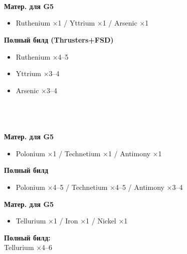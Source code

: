 \begin{tcolorbox}[edbox-titled, title=3.~PROFESSOR PALIN]
\\
\\
\\[1mm]
\edrule
{\color{edorange}\fontsize{6.5}{8}\selectfont\bfseries Матер. для G5}\\[0.5mm]
\begin{itemize}
\item Ruthenium ×1 / Yttrium ×1 / Arsenic ×1
\end{itemize}
{\color{edorange}\fontsize{6.5}{8}\selectfont\bfseries Полный билд (Thrusters+FSD)}\\[0.5mm]
\begin{itemize}
\item Ruthenium ×4--5
\item Yttrium ×3--4
\item Arsenic ×3--4
\end{itemize}
\end{tcolorbox}

\begin{tcolorbox}[edbox-titled, title=4.~MARCO QWENT]
\\
\\
\\[1mm]
\edrule
{\color{edorange}\fontsize{6.5}{8}\selectfont\bfseries Матер. для G5}\\[0.5mm]
\begin{itemize}
\item Polonium ×1 / Technetium ×1 / Antimony ×1
\end{itemize}
{\color{edorange}\fontsize{6.5}{8}\selectfont\bfseries Полный билд}\\[0.5mm]
\begin{itemize}
\item Polonium ×4--5 / Technetium ×4--5 / Antimony ×3--4
\end{itemize}
\end{tcolorbox}

\begin{tcolorbox}[edbox-titled, title=5.~LORI JAMESON]

\vspace{1mm}
\edrule
{\color{edorange}\fontsize{6.5}{8}\selectfont\bfseries Матер. для G5\par}
\vspace{0.5mm}
\begin{itemize}
\item Tellurium ×1 / Iron ×1 / Nickel ×1
\end{itemize}
{\color{edorange}\fontsize{6.5}{8}\selectfont\bfseries Полный билд:}\\[0.5mm]
{\fontsize{7}{8.5}\selectfont Tellurium ×4--6}
\end{tcolorbox}

